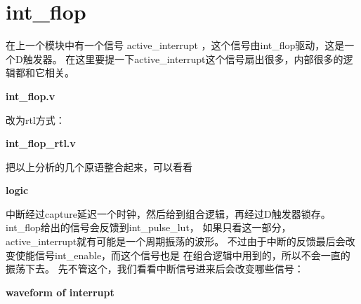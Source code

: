 \section{int\_flop}
在上一个模块中有一个信号 active\_interrupt ，这个信号由int\_flop驱动，这是一个D触发器。
在这里要提一下active\_interrupt这个信号扇出很多，内部很多的逻辑都和它相关。

\textbf{int\_flop.v}


改为rtl方式：

\textbf{int\_flop\_rtl.v}


把以上分析的几个原语整合起来，可以看看

\textbf{logic}


中断经过capture延迟一个时钟，然后给到组合逻辑，再经过D触发器锁存。
int\_flop给出的信号会反馈到int\_pulse\_lut，
如果只看这一部分，active\_interrupt就有可能是一个周期振荡的波形。
不过由于中断的反馈最后会改变使能信号int\_enable，而这个信号也是
在组合逻辑中用到的，所以不会一直的振荡下去。
先不管这个，我们看看中断信号进来后会改变哪些信号：

\textbf{waveform of interrupt}




